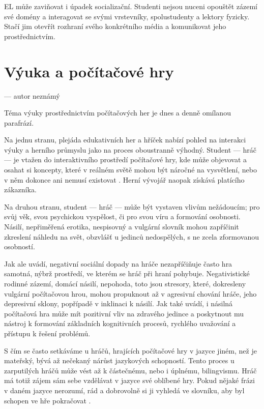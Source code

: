 EL může zaviňovat i úpadek socializační. Studenti nejsou nuceni opouštět zázemí své domény a interagovat se svými vrstevníky, spolustudenty a lektory fyzicky. Stačí jim otevřít rozhraní svého konkrétního média a komunikovat jeho prostřednictvím.

\section{Výuka a počítačové hry}

\epigraph{\sl{}}{--- autor neznámý}

Téma výuky prostřednictvím počítačových her je dnes a denně omílanou parafrází. 

Na jednu stranu, plejáda edukativních her a hříček nabízí pohled na interakci výuky a herního průmyslu jako na proces oboustranně výhodný. Student --- hráč --- je vtažen do interaktivního prostředí počítačové hry, kde může objevovat a osahat si koncepty, které v reálném světě mohou být náročné na vysvětlení, nebo v něm dokonce ani nemusí existovat \cite{graven_2006}. Herní vývojář naopak získává platícího zákazníka.

Na druhou stranu, student --- hráč --- může být vystaven vlivům nežádoucím; pro svůj věk, svou psychickou vyspělost, či pro svou víru a formování osobnosti. Násilí, nepřiměřená erotika, nespisovný a vulgární slovník mohou zapříčinit zkreslení náhledu na svět, obzvlášť u jedinců nedospělých, s ne zcela zformovanou osobností. 

Jak ale \cite{xuemin_2009} uvádí, negativní sociální dopady na hráče nezapříčiňuje často hra samotná, nýbrž prostředí, ve kterém se hráč při hraní pohybuje. Negativistické rodinné zázemí, domácí násilí, nepohoda, toto jsou stresory, které, dokresleny vulgární počítačovou hrou, mohou propuknout až v agresivní chování hráče, jeho depresivní sklony, popřípadě v inklinaci k násilí. Jak \cite{xuemin_2009} také uvádí, i násilná počítačová hra může mít pozitivní vliv na zdravého jedince a poskytnout mu nástroj k formování základních kognitivních procesů, rychlého uvažování a přístupu k řešení problémů.

S čím se často setkáváme u hráčů, hrajících počítačové hry v jazyce jiném, než je mateřský, bývá až nečekaný nárůst jazykových schopností. Tento proces u zarputilých hráčů může vést až k částečnému, nebo i úplnému, bilingvismu. Hráč má totiž zájem sám sebe vzdělávat v jazyce své oblíbené hry. Pokud nějaké frázi v daném jazyce nerozumí, rád a dobrovolně si ji vyhledá ve slovníku, aby byl schopen ve hře pokračovat \cite{bialystok_2006}.

